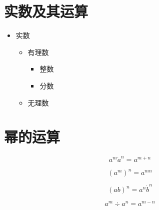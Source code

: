 \documentclass{article}
\begin{document}
\section{实数及其运算}

\begin{itemize}
    \item 实数
        \begin{itemize}
            \item 有理数
                \begin{itemize}
                    \item 整数
                    \item 分数
                \end{itemize}
            \item 无理数
        \end{itemize}
\end{itemize}

\section{幂的运算}
$$a^m \dot a^n = a^{m+n}$$ 
    
$$(a^m)^n = a^{mn} $$
    
$$(ab)^n = a^n \dot b^n $$
    
$$a^m \div a^n = a^{m-n} $$
\end{document}
